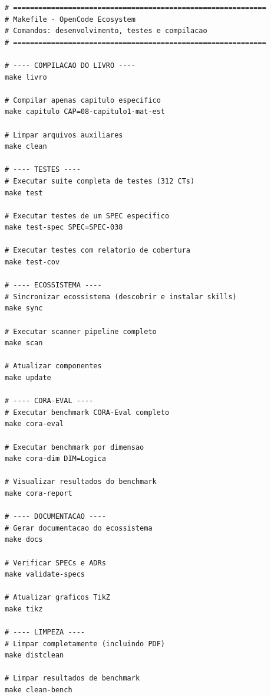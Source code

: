 \begin{lstlisting}[caption={Comandos Makefile do OpenCode Ecosystem},
                   label={cod:makefile}, style=bashstyle]
# ============================================================
# Makefile - OpenCode Ecosystem
# Comandos: desenvolvimento, testes e compilacao
# ============================================================

# ---- COMPILACAO DO LIVRO ----
make livro

# Compilar apenas capitulo especifico
make capitulo CAP=08-capitulo1-mat-est

# Limpar arquivos auxiliares
make clean

# ---- TESTES ----
# Executar suite completa de testes (312 CTs)
make test

# Executar testes de um SPEC especifico
make test-spec SPEC=SPEC-038

# Executar testes com relatorio de cobertura
make test-cov

# ---- ECOSSISTEMA ----
# Sincronizar ecossistema (descobrir e instalar skills)
make sync

# Executar scanner pipeline completo
make scan

# Atualizar componentes
make update

# ---- CORA-EVAL ----
# Executar benchmark CORA-Eval completo
make cora-eval

# Executar benchmark por dimensao
make cora-dim DIM=Logica

# Visualizar resultados do benchmark
make cora-report

# ---- DOCUMENTACAO ----
# Gerar documentacao do ecossistema
make docs

# Verificar SPECs e ADRs
make validate-specs

# Atualizar graficos TikZ
make tikz

# ---- LIMPEZA ----
# Limpar completamente (incluindo PDF)
make distclean

# Limpar resultados de benchmark
make clean-bench
\end{lstlisting}
